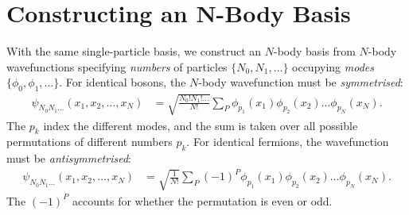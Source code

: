 \documentclass[qo.tex]{subfiles}
\begin{document}
\section{Constructing an N-Body Basis}
With the same single-particle basis, we construct an $N$-body basis from $N$-body wavefunctions specifying \emph{numbers} of particles $\{N_0,N_1,\dots\}$ occupying \emph{modes} $\{\phi_0,\phi_1,\dots\}$.
For identical bosons, the $N$-body wavefunction must be \emph{symmetrised}:
\begin{align}
    \psi_{N_0 N_1\dots}(x_1,x_2,\dots,x_N) &= \sqrt{\frac{N_0!N_1!\dots}{N!}}\sum_P \phi_{p_1}(x_1)\phi_{p_2}(x_2)\dots\phi_{p_N}(x_N).
\end{align}
The $p_k$ index the different modes, and the sum is taken over all possible permutations of different numbers $p_k$.
For identical fermions, the wavefunction must be \emph{antisymmetrised}:
\begin{align}
    \psi_{N_0 N_1\dots}(x_1,x_2,\dots,x_N) &= \sqrt{\frac{1}{N!}}\sum_P (-1)^P \phi_{p_1}(x_1)\phi_{p_2}(x_2)\dots\phi_{p_N}(x_N).
\end{align}
The $(-1)^P$ accounts for whether the permutation is even or odd.
\end{document}
